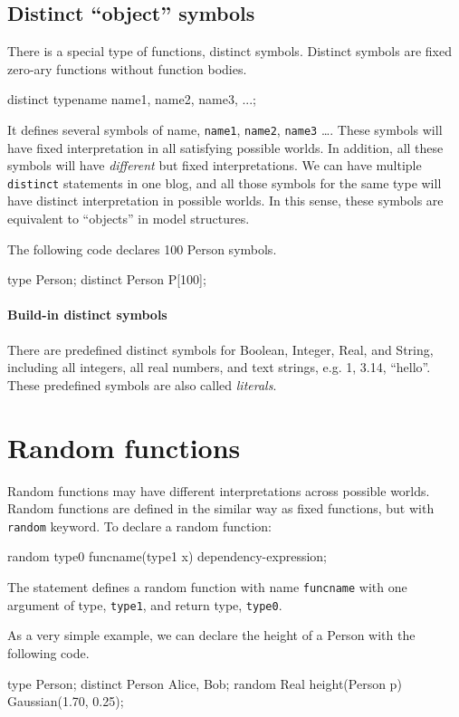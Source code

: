 \documentclass[12pt]{article}
\begin{document}
\subsection{Distinct ``object'' symbols}
There is a special type of functions, distinct symbols. 
Distinct symbols are fixed zero-ary functions without function bodies.
\begin{blogcode}
distinct typename name1, name2, name3, ...;
\end{blogcode}
It defines several symbols of name, \texttt{name1}, \texttt{name2}, \texttt{name3} \dots.
These symbols will have fixed interpretation in all satisfying possible worlds. In addition, all these symbols will have \emph{different} but fixed interpretations. 
We can have multiple \texttt{distinct} statements in one blog, and all those symbols for the same type will have 
distinct interpretation in possible worlds. In this sense, these symbols are equivalent to ``objects'' in model structures. 

The following \bl code declares 100 Person symbols.  
\begin{blogcode}
type Person;
distinct Person P[100];
\end{blogcode}


\paragraph{Build-in distinct symbols}
There are predefined distinct symbols for Boolean, Integer,  Real, and String, including all integers, all real numbers, and text strings, e.g. 1, 3.14, ``hello''. These predefined symbols are also called {\em literals}.


\section{Random functions}
Random functions may have different interpretations across possible worlds. Random functions are defined in the similar way as fixed functions, but with \texttt{random} keyword.
To declare a random function:
\begin{blogcode}
random type0 funcname(type1 x) dependency-expression;
\end{blogcode}
The statement defines a random function with name \texttt{funcname} with one argument of type, \texttt{type1}, and return type, \texttt{type0}. 

As a very simple example, we can declare the height of a Person with the following code. 
\begin{blogcode}
type Person;
distinct Person Alice, Bob;
random Real height(Person p) ~ Gaussian(1.70, 0.25);
\end{blogcode}
\end{document}
